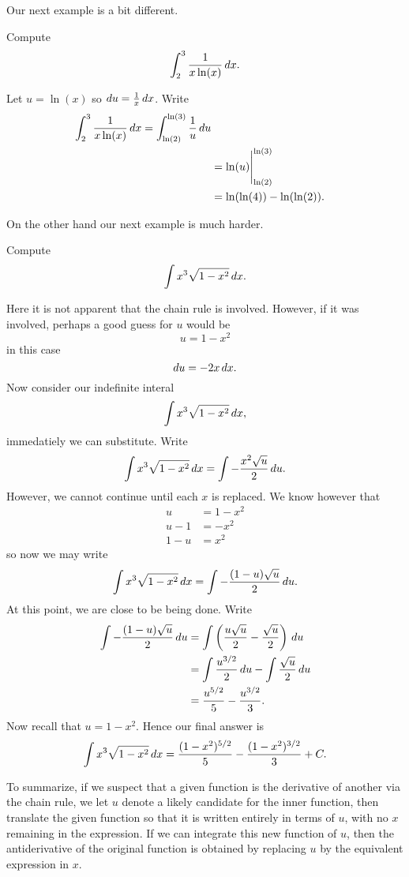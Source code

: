 Our next example is a bit different.

\begin{example}
Compute
\[
\int_{2}^{3} \frac{1}{x\ln(x)} \, d x.
\]
\end{example}

\begin{solution}
Let $u=\ln(x)$ so $du=\frac{1}{x}\, d x$. Write
\begin{align*}
\int_{2}^{3} \frac{1}{x\ln(x)} \, d x = \int_{\ln(2)}^{\ln(3)} \frac{1}{u} \, d u\\
&= \ln(u) \Biggr|_{\ln(2)}^{\ln(3)}\\
& = \ln(\ln(4)) - \ln(\ln(2)).
\end{align*}
\end{solution}


On the other hand our next example is much harder.

\begin{example} Compute
\[
\int x^3\sqrt{1-x^2}\, d x.
\]
\end{example}

\begin{solution} 
Here it is not apparent that the chain rule is involved. However, if
it was involved, perhaps a good guess for $u$ would be
\[
u = 1-x^2
\]
in this case
\[
du = -2x \, d x.
\]
Now consider our indefinite interal
\[
\int x^3\sqrt{1-x^2}\, d x,
\]
immedatiely we can substitute. Write
\[
\int x^3\sqrt{1-x^2}\, d x = \int -\frac{x^2\sqrt{u}}{2}\, d u.
\]
However, we cannot continue until each $x$ is replaced. We know however that 
\begin{align*}
u &= 1-x^2 \\
u -1 &= -x^2\\
1- u &= x^2
\end{align*}
so now we may write
\[
\int x^3\sqrt{1-x^2}\, d x = \int -\frac{(1-u)\sqrt{u}}{2}\, d u.
\]
At this point, we are close to be being done. Write
\begin{align*}
\int -\frac{(1-u)\sqrt{u}}{2}\, d u &= \int \left(\frac{u\sqrt{u}}{2} - \frac{\sqrt{u}}{2}\right) \, d u \\
&= \int \frac{u^{3/2}}{2} \, d u - \int \frac{\sqrt{u}}{2} \, d u \\
&= \frac{u^{5/2}}{5} - \frac{u^{3/2}}{3}.
\end{align*}
Now recall that $u = 1-x^2$. Hence our final answer is
\[
\int x^3\sqrt{1-x^2}\, d x = \frac{(1-x^2)^{5/2}}{5} - \frac{(1-x^2)^{3/2}}{3}+C.
\]
\end{solution}

To summarize, if we suspect that a given function is the derivative of
another via the chain rule, we let $u$ denote a likely candidate for
the inner function, then translate the given function so that it is
written entirely in terms of $u$, with no $x$ remaining in the
expression. If we can integrate this new function of $u$, then the
antiderivative of the original function is obtained by replacing $u$
by the equivalent expression in $x$.



